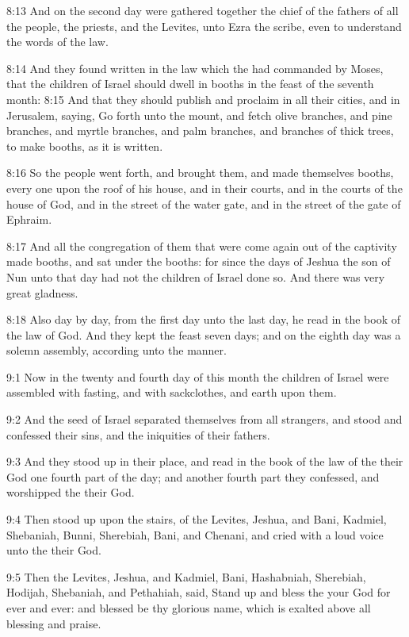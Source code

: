 8:13 And on the second day were gathered together the chief of the fathers of all the people, the priests, and the Levites, unto Ezra the scribe, even to understand the words of the law.

8:14 And they found written in the law which the \LORD had commanded by Moses, that the children of Israel should dwell in booths in the feast of the seventh month: 8:15 And that they should publish and proclaim in all their cities, and in Jerusalem, saying, Go forth unto the mount, and fetch olive branches, and pine branches, and myrtle branches, and palm branches, and branches of thick trees, to make booths, as it is written.

8:16 So the people went forth, and brought them, and made themselves booths, every one upon the roof of his house, and in their courts, and in the courts of the house of God, and in the street of the water gate, and in the street of the gate of Ephraim.

8:17 And all the congregation of them that were come again out of the captivity made booths, and sat under the booths: for since the days of Jeshua the son of Nun unto that day had not the children of Israel done so. And there was very great gladness.

8:18 Also day by day, from the first day unto the last day, he read in the book of the law of God. And they kept the feast seven days; and on the eighth day was a solemn assembly, according unto the manner.

9:1 Now in the twenty and fourth day of this month the children of Israel were assembled with fasting, and with sackclothes, and earth upon them.

9:2 And the seed of Israel separated themselves from all strangers, and stood and confessed their sins, and the iniquities of their fathers.

9:3 And they stood up in their place, and read in the book of the law of the \LORD their God one fourth part of the day; and another fourth part they confessed, and worshipped the \LORD their God.

9:4 Then stood up upon the stairs, of the Levites, Jeshua, and Bani, Kadmiel, Shebaniah, Bunni, Sherebiah, Bani, and Chenani, and cried with a loud voice unto the \LORD their God.

9:5 Then the Levites, Jeshua, and Kadmiel, Bani, Hashabniah, Sherebiah, Hodijah, Shebaniah, and Pethahiah, said, Stand up and bless the \LORD your God for ever and ever: and blessed be thy glorious name, which is exalted above all blessing and praise.

